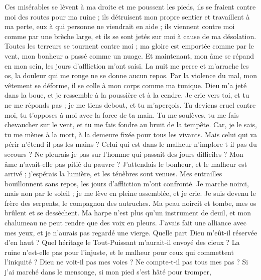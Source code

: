 \begin{multicols}{2}
Ces misérables se lèvent à ma droite et me poussent les pieds, ils se fraient contre moi des routes pour ma ruine ;
ils détruisent mon propre sentier et travaillent à ma perte, eux à qui personne ne viendrait en aide ;
ils viennent contre moi comme par une brèche large, et ils se sont jetés sur moi à cause de ma désolation.
Toutes les terreurs se tournent contre moi ; ma gloire est emportée comme par le vent, mon bonheur a passé comme un nuage.
Et maintenant, mon âme se répand en mon sein, les jours d'affliction m'ont saisi.
La nuit me perce et m'arrache les os, la douleur qui me ronge ne se donne aucun repos.
Par la violence du mal, mon vêtement se déforme, il se colle à mon corps comme ma tunique.
Dieu m'a jeté dans la boue, et je ressemble à la poussière et à la cendre.
Je crie vers toi, et tu ne me réponds pas ; je me tiens debout, et tu m'aperçois.
Tu deviens cruel contre moi, tu t'opposes à moi avec la force de ta main.
Tu me soulèves, tu me fais chevaucher sur le vent, et tu me fais fondre au bruit de la tempête.
Car, je le sais, tu me mènes à la mort, à la demeure fixée pour tous les vivants.
Mais celui qui va périr n'étend-il pas les mains ? Celui qui est dans le malheur n'implore-t-il pas du secours ?
Ne pleurais-je pas sur l'homme qui passait des jours difficiles ? Mon âme n'avait-elle pas pitié du pauvre ?
J'attendais le bonheur, et le malheur est arrivé ; j'espérais la lumière, et les ténèbres sont venues.
Mes entrailles bouillonnent sans repos, les jours d'affliction m'ont confronté.
Je marche noirci, mais non par le soleil ; je me lève en pleine assemblée, et je crie.
Je suis devenu le frère des serpents, le compagnon des autruches.
Ma peau noircit et tombe, mes os brûlent et se dessèchent.
Ma harpe n'est plus qu'un instrument de deuil, et mon chalumeau ne peut rendre que des voix en pleurs.
\VerseOne{}J'avais fait une alliance avec mes yeux, et je n'aurais pas regardé une vierge.
Quelle part Dieu m'eût-il réservée d'en haut ? Quel héritage le Tout-Puissant m'aurait-il envoyé des cieux ?
La ruine n'est-elle pas pour l'injuste, et le malheur pour ceux qui commettent l'iniquité ?
Dieu ne voit-il pas mes voies ? Ne compte-t-il pas tous mes pas ?
Si j'ai marché dans le mensonge, si mon pied s'est hâté pour tromper,

\end{multicols}
